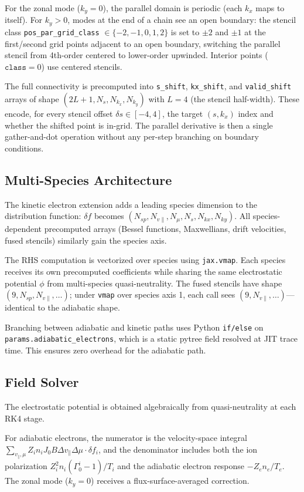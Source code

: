 \documentclass{article}
\theoremstyle{plain}
\theoremstyle{definition}
\theoremstyle{remark}
\begin{document}
For the zonal mode ($k_y = 0$), the parallel domain is periodic (each $k_x$ maps to itself). For $k_y > 0$, modes at the end of a chain see an open boundary: the stencil class \texttt{pos\_par\_grid\_class} $\in \{-2, -1, 0, 1, 2\}$ is set to $\pm 2$ and $\pm 1$ at the first/second grid points adjacent to an open boundary, switching the parallel stencil from 4th-order centered to lower-order upwinded. Interior points ($\texttt{class} = 0$) use centered stencils.

The full connectivity is precomputed into \texttt{s\_shift}, \texttt{kx\_shift}, and \texttt{valid\_shift} arrays of shape $(2L{+}1, N_s, N_{k_x}, N_{k_y})$ with $L = 4$ (the stencil half-width). These encode, for every stencil offset $\delta s \in [-4, 4]$, the target $(s, k_x)$ index and whether the shifted point is in-grid. The parallel derivative is then a single gather-and-dot operation without any per-step branching on boundary conditions.

\subsection{Multi-Species Architecture}
The kinetic electron extension adds a leading species dimension to the distribution function: $\delta f$ becomes $(N_{sp}, N_{v\parallel}, N_\mu, N_s, N_{kx}, N_{ky})$. All species-dependent precomputed arrays (Bessel functions, Maxwellians, drift velocities, fused stencils) similarly gain the species axis.

The RHS computation is vectorized over species using \texttt{jax.vmap}. Each species receives its own precomputed coefficients while sharing the same electrostatic potential $\phi$ from multi-species quasi-neutrality. The fused stencils have shape $(9, N_{sp}, N_{v\parallel}, \ldots)$; under \texttt{vmap} over species axis 1, each call sees $(9, N_{v\parallel}, \ldots)$---identical to the adiabatic shape.

Branching between adiabatic and kinetic paths uses Python \texttt{if/else} on \texttt{params.adiabatic\_electrons}, which is a static pytree field resolved at JIT trace time. This ensures zero overhead for the adiabatic path.

\subsection{Field Solver}
The electrostatic potential is obtained algebraically from quasi-neutrality at each RK4 stage.

For adiabatic electrons, the numerator is the velocity-space integral $\sum_{v_\parallel,\mu} Z_i n_i J_0 B \Delta v_\parallel \Delta\mu \cdot \delta f_i$, and the denominator includes both the ion polarization $Z_i^2 n_i (\Gamma_0^i - 1)/T_i$ and the adiabatic electron response $-Z_e n_e / T_e$. The zonal mode ($k_y=0$) receives a flux-surface-averaged correction.
\end{document}
